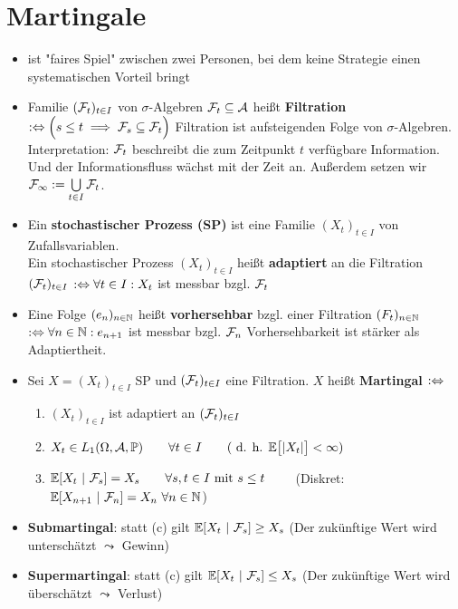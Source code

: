 \documentclass[12pt]{scrartcl}
\begin{document}
	\section{Martingale}
	\begin{itemize}
		\item ist "faires Spiel" zwischen zwei Personen, bei dem keine Strategie einen systematischen Vorteil bringt
		\item Familie $(\mathcal{F}_t)_{t\in I}$ von $\sigma$-Algebren $\mathcal{F}_t\subseteq\mathcal{A}$ heißt \textbf{Filtration} 
		$:\Leftrightarrow\Big( s\leq t\implies\mathcal{F}_s\subseteq\mathcal{F}_t\Big)$
		Filtration ist aufsteigenden Folge von $\sigma$-Algebren.
		Interpretation: $\mathcal{F}_t$ beschreibt die zum Zeitpunkt $t$ verfügbare Information. Und der Informationsfluss wächst mit der Zeit an.
		Außerdem setzen wir $\mathcal{F}_\infty:=\bigcup\limits_{t\in I}\mathcal{F}_t$.
		\item Ein \textbf{stochastischer Prozess (SP)} ist eine Familie $(X_t)_{t\in I}$ von Zufallsvariablen.\\
		Ein stochastischer Prozess $(X_t)_{t\in I}$ heißt \textbf{adaptiert} an die Filtration $(\mathcal{F}_t)_{t\in I}$
		$:\Leftrightarrow\forall t\in I: X_t$ ist messbar bzgl. $\mathcal{F}_t$
		\item Eine Folge $(e_n)_{n\in\mathbb{N}}$ heißt \textbf{vorhersehbar} bzgl. einer Filtration $(F_t)_{n\in\mathbb{N}}$
		$:\Leftrightarrow\forall n\in\mathbb{N}:e_{n+1}$ ist messbar bzgl. $\mathcal{F}_n$
		Vorhersehbarkeit ist stärker als Adaptiertheit.
		\item Sei $X=(X_t)_{t\in I}$ SP und $(\mathcal{F}_t)_{t\in I}$ eine Filtration.
		$X$ heißt \textbf{Martingal} $:\Leftrightarrow$
		\begin{enumerate}[label=(\alph*)]
			\item $(X_t)_{t\in I}$ ist adaptiert an $(\mathcal{F}_t)_{t\in I}$
			\item $\begin{aligned}
				X_t\in L_1(\Omega,\mathcal{A},\mathbb{P}) \qquad \forall t\in I\qquad(\text{ d. h. } \mathbb{E}\big[|X_t|\big]<\infty)
			\end{aligned}$
			\item $\begin{aligned}
				\mathbb{E}[X_t~|~\mathcal{F}_s]=X_s\qquad\forall s,t\in I\text{ mit } s\leq t
			\end{aligned}\qquad$
			(Diskret:
		$ \mathbb{E}[X_{n+1}~|~\mathcal{F}_n]=X_n~\forall n\in\mathbb{N}$) 
		\end{enumerate}
		\item \textbf{Submartingal}: statt (c) gilt $\mathbb{E}[X_t~|~\mathcal{F}_s]\geq X_s$ (Der zukünftige Wert wird unterschätzt $\leadsto$ Gewinn)
		\item \textbf{Supermartingal}: statt (c) gilt $\mathbb{E}[X_t~|~\mathcal{F}_s]\leq X_s$ (Der zukünftige Wert wird überschätzt $\leadsto$ Verlust)

\end{itemize}
\end{document}
